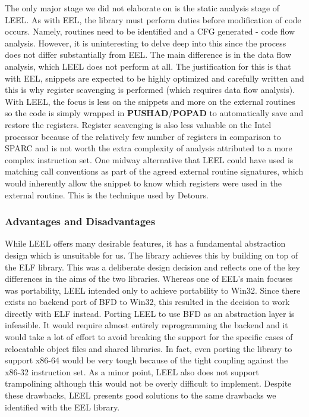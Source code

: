 The only major stage we did not elaborate on is the static analysis stage of LEEL. As with EEL, the library must perform duties before modification of code occurs. Namely, routines need to be identified and a CFG generated - code flow analysis. However, it is uninteresting to delve deep into this since the process does not differ substantially from EEL. The main difference is in the data flow analysis, which LEEL does not perform at all. The justification for this is that with EEL, snippets are expected to be highly optimized and carefully written and this is why register scavenging is performed (which requires data flow analysis). With LEEL, the focus is less on the snippets and more on the external routines so the code is simply wrapped in \textbf{PUSHAD}/\textbf{POPAD} to automatically save and restore the registers. Register scavenging is also less valuable on the Intel processor because of the relatively few number of registers in comparison to SPARC and is not worth the extra complexity of analysis attributed to a more complex instruction set. One midway alternative that LEEL could have used is matching call conventions as part of the agreed external routine signatures, which would inherently allow the snippet to know which registers were used in the external routine. This is the technique used by Detours.

\subsubsection{Advantages and Disadvantages}

While LEEL offers many desirable features, it has a fundamental abstraction design which is unsuitable for us. The library achieves this by building on top of the ELF library. This was a deliberate design decision and reflects one of the key differences in the aims of the two libraries. Whereas one of EEL's main focuses was portability, LEEL intended only to achieve portability to Win32. Since there exists no backend port of BFD to Win32, this resulted in the decision to work directly with ELF instead. Porting LEEL to use BFD as an abstraction layer is infeasible. It would require almost entirely reprogramming the backend and it would take a lot of effort to avoid breaking the support for the specific cases of relocatable object files and shared libraries. In fact, even porting the library to support x86-64 would be very tough because of the tight coupling against the x86-32 instruction set. As a minor point, LEEL also does not support trampolining although this would not be overly difficult to implement. Despite these drawbacks, LEEL presents good solutions to the same drawbacks we identified with the EEL library.

